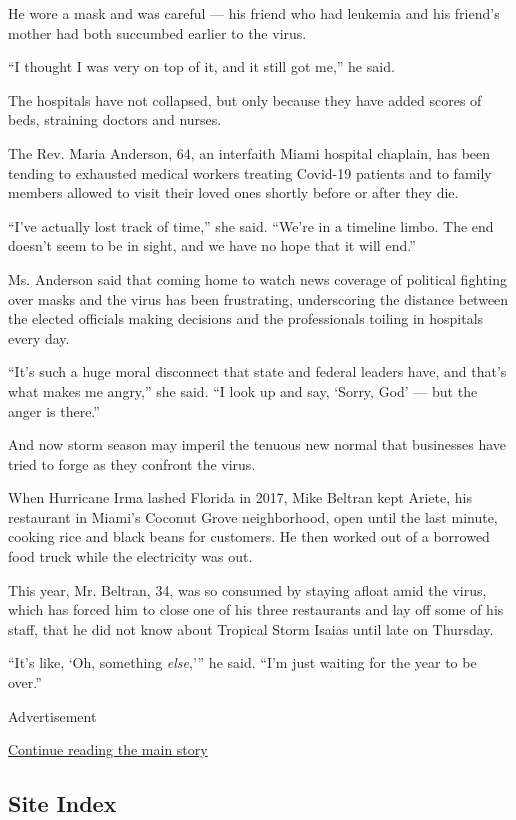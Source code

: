 He wore a mask and was careful --- his friend who had leukemia and his
friend's mother had both succumbed earlier to the virus.

``I thought I was very on top of it, and it still got me,'' he said.

The hospitals have not collapsed, but only because they have added
scores of beds, straining doctors and nurses.

The Rev. Maria Anderson, 64, an interfaith Miami hospital chaplain, has
been tending to exhausted medical workers treating Covid-19 patients and
to family members allowed to visit their loved ones shortly before or
after they die.

``I've actually lost track of time,'' she said. ``We're in a timeline
limbo. The end doesn't seem to be in sight, and we have no hope that it
will end.''

Ms. Anderson said that coming home to watch news coverage of political
fighting over masks and the virus has been frustrating, underscoring the
distance between the elected officials making decisions and the
professionals toiling in hospitals every day.

``It's such a huge moral disconnect that state and federal leaders have,
and that's what makes me angry,'' she said. ``I look up and say, `Sorry,
God' --- but the anger is there.''

And now storm season may imperil the tenuous new normal that businesses
have tried to forge as they confront the virus.

When Hurricane Irma lashed Florida in 2017, Mike Beltran kept Ariete,
his restaurant in Miami's Coconut Grove neighborhood, open until the
last minute, cooking rice and black beans for customers. He then worked
out of a borrowed food truck while the electricity was out.

This year, Mr. Beltran, 34, was so consumed by staying afloat amid the
virus, which has forced him to close one of his three restaurants and
lay off some of his staff, that he did not know about Tropical Storm
Isaias until late on Thursday.

``It's like, `Oh, something \emph{else},''' he said. ``I'm just waiting
for the year to be over.''

Advertisement

\protect\hyperlink{after-bottom}{Continue reading the main story}

\hypertarget{site-index}{%
\subsection{Site Index}\label{site-index}}

